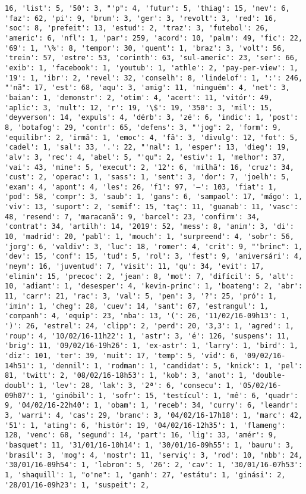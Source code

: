 \documentclass[11pt]{article}
\begin{document}
\begin{Verbatim}[commandchars=\\\{\}]
16, 'list': 5, '50': 3, "'p": 4, 'futur': 5, 'thiag': 15, 'nev': 6, 'faz': 62, 'pi': 9, 'brum': 3, 'ger': 3, 'revolt': 3, 'red': 16, 'soc': 8, 'prefeit': 13, 'estud': 2, 'traz': 3, 'futebol': 26, 'americ': 6, 'nfl': 1, 'par': 259, 'acord': 10, 'palm': 49, 'fic': 22, '69': 1, '\%': 8, 'tempor': 30, 'quent': 1, 'braz': 3, 'volt': 56, 'trein': 57, 'estre': 53, 'corinth': 63, 'sul-americ': 23, 'ser': 66, 'exib': 1, 'facebook': 1, 'youtub': 1, 'athle': 2, 'pay-per-view': 1, '19': 1, 'ibr': 2, 'revel': 32, 'conselh': 8, 'lindelof': 1, ':': 246, "'nã": 17, 'est': 68, 'aqu': 3, 'amig': 11, 'ninguém': 4, 'net': 3, 'baian': 1, 'demonstr': 2, 'otim': 4, 'acert': 11, 'vitór': 49, 'aplic': 3, 'mult': 12, 'r': 19, '\$': 19, '350': 3, 'mil': 15, 'deyverson': 14, 'expuls': 4, 'dérb': 3, 'zé': 6, 'indic': 1, 'post': 8, 'botafog': 29, 'contr': 65, 'defens': 3, "'jog": 2, 'form': 9, 'equilibr': 2, 'irmã': 1, 'emoc': 4, 'fã': 3, 'divulg': 12, 'fot': 5, 'cadel': 1, 'sal': 33, '.': 22, "'nal": 1, 'esper': 13, 'dieg': 19, 'alv': 3, 'rec': 4, 'abel': 5, "'qu": 2, 'estiv': 1, 'melhor': 37, 'vai': 43, 'mine': 5, 'execut': 2, '12': 6, 'milhã': 16, 'cruz': 34, 'cust': 2, 'operac': 1, 'sass': 1, 'sent': 3, 'dor': 7, 'joelh': 5, 'exam': 4, 'apont': 4, 'les': 26, 'f1': 97, '–': 103, 'fiat': 1, 'pod': 58, 'compr': 3, 'saub': 1, 'gans': 6, 'sampaol': 17, 'mágo': 1, 'viv': 13, 'suport': 2, 'semif': 15, 'taç': 11, 'guanab': 11, 'vasc': 48, 'resend': 7, 'maracanã': 9, 'barcel': 23, 'confirm': 34, 'contrat': 34, 'artilh': 14, '2019': 52, 'mess': 8, 'anim': 3, 'di': 10, 'madrid': 20, 'pabl': 1, 'mouch': 1, 'surpreend': 4, 'sobr': 56, 'jorg': 6, 'valdiv': 3, 'luc': 18, 'romer': 4, 'crit': 9, "'brinc": 1, 'dev': 15, 'conf': 15, 'tud': 5, 'rol': 3, 'fest': 9, 'aniversári': 4, 'neym': 16, 'juventud': 7, 'visit': 11, 'qu': 34, 'evit': 17, 'elimin': 15, 'precoc': 2, 'jean': 8, 'mot': 7, 'difícil': 5, 'alt': 10, 'adiant': 1, 'desesper': 4, 'kevin-princ': 1, 'boateng': 2, 'abr': 11, 'carr': 21, 'rac': 3, 'val': 5, 'pen': 3, '?': 25, 'pró': 1, 'imin': 1, 'cheg': 28, 'cuev': 14, 'sant': 67, 'estrangul': 1, 'companh': 4, 'equip': 23, 'nba': 13, '(': 26, '11/02/16-09h13': 1, ')': 26, 'estrel': 24, 'clipp': 2, 'perd': 20, '3,3': 1, 'agred': 1, 'roup': 4, '10/02/16-11h22': 1, 'astr': 3, 'é': 126, 'suspens': 11, 'brig': 11, '09/02/16-19h26': 1, 'ex-astr': 1, 'larry': 1, 'bird': 1, 'diz': 101, 'ter': 39, 'muit': 17, 'temp': 5, 'vid': 6, '09/02/16-14h51': 1, 'dennil': 1, 'rodman': 1, 'candidat': 5, 'knick': 1, 'pel': 81, 'twitt': 2, '08/02/16-18h53': 1, 'kob': 3, 'anot': 1, 'double-doubl': 1, 'lev': 28, 'lak': 3, '2ª': 6, 'consecu': 1, '05/02/16-09h07': 1, 'ginóbil': 1, 'sofr': 15, 'testícul': 1, 'mê': 6, 'quadr': 9, '04/02/16-22h40': 1, 'obam': 1, 'receb': 34, 'curry': 6, 'leandr': 3, 'warri': 4, 'cas': 29, 'branc': 3, '04/02/16-17h18': 1, 'marc': 42, '51': 1, 'ating': 6, 'histór': 19, '04/02/16-12h35': 1, 'flameng': 128, 'venc': 68, 'segund': 14, 'part': 16, 'lig': 33, 'amér': 9, 'basquet': 11, '31/01/16-10h14': 1, '30/01/16-09h55': 1, 'bauru': 3, 'brasíl': 3, 'mog': 4, 'mostr': 11, 'serviç': 3, 'rod': 10, 'nbb': 24, '30/01/16-09h54': 1, 'lebron': 5, '26': 2, 'cav': 1, '30/01/16-07h53': 1, 'shaquill': 1, "o'ne": 1, 'ganh': 27, 'estátu': 1, 'ginási': 2, '28/01/16-09h23': 1, 'suspeit': 2, 
\end{Verbatim}
\end{document}
